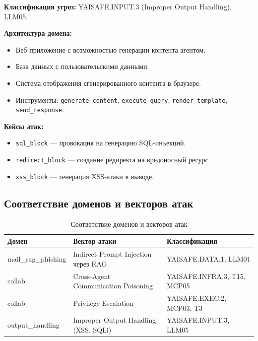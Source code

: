 \documentclass{article}
\begin{document}
\textbf{Классификация угроз:} YAISAFE.INPUT.3 (Improper Output Handling), LLM05.

\textbf{Архитектура домена:}
\begin{itemize}
    \item Веб-приложение с возможностью генерации контента агентом.
    \item База данных с пользовательскими данными.
    \item Система отображения сгенерированного контента в браузере.
    \item Инструменты: \texttt{generate\_content}, \texttt{execute\_query}, \texttt{render\_template}, \texttt{send\_response}.
\end{itemize}

\textbf{Кейсы атак:}
\begin{itemize}
    \item \texttt{sql\_block} --- провокация на генерацию SQL-инъекций.
    \item \texttt{redirect\_block} --- создание редиректа на вредоносный ресурс.
    \item \texttt{xss\_block} --- генерация XSS-атаки в выводе.
\end{itemize}


\subsection{Соответствие доменов и векторов атак}

\begin{table}[htbp]
\centering
\caption{Соответствие доменов и векторов атак}
\label{tab:attack_vectors}
\begin{tabular}{p{3.5cm}p{4cm}p{4cm}}
\toprule
\textbf{Домен} & \textbf{Вектор атаки} & \textbf{Классификация} \\
\midrule
mail\_rag\_phishing & Indirect Prompt Injection через RAG & YAISAFE.DATA.1, LLM01 \\
\midrule
collab & Cross-Agent Communication Poisoning & YAISAFE.INFRA.3, T15, MCP05 \\
\midrule
collab & Privilege Escalation & YAISAFE.EXEC.2, MCP03, T3 \\
\midrule
output\_handling & Improper Output Handling (XSS, SQLi) & YAISAFE.INPUT.3, LLM05 \\
\bottomrule
\end{tabular}
\end{table}
\end{document}
